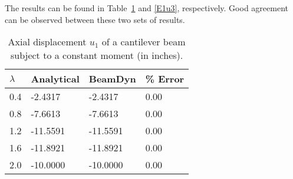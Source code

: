 The results can be found in Table~\ref{E1u1} and \ref{E1u3}, respectively. Good agreement can be observed between these two sets of results.
\begin{table}[tbp]
\centering 
\caption{Axial displacement $u_1$ of a cantilever beam subject to a constant moment (in inches).}
\label{E1u1} 
	\begin{tabular}{| l | l | l | l |}
    	\hline
    	$\lambda$ & Analytical & BeamDyn  & \% Error \\ \hline
    	0.4       & -2.4317    & -2.4317  & 0.00       \\ \hline
    	0.8       & -7.6613    & -7.6613  & 0.00       \\ \hline
    	1.2       & -11.5591   & -11.5591 & 0.00       \\ \hline
    	1.6       & -11.8921   & -11.8921 & 0.00       \\ \hline
    	2.0       & -10.0000   & -10.0000  & 0.00       \\ \hline
    \end{tabular}
\end{table}

